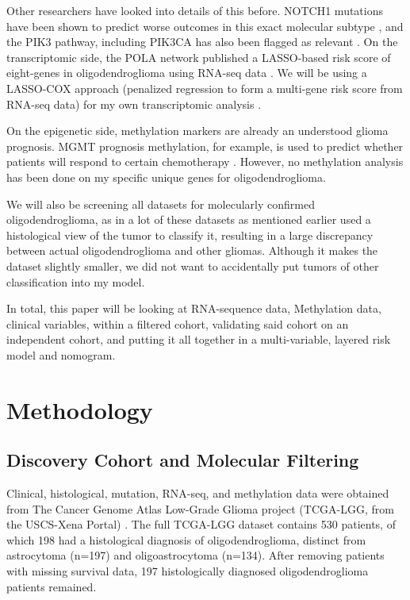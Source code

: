 \documentclass[11pt, letterpaper]{article}
\begin{document}
Other researchers have looked into details of this before. NOTCH1 mutations have been shown to predict worse outcomes in this exact molecular subtype \cite{Aoki2018}, and the PIK3 pathway, including PIK3CA has also been flagged as relevant \cite{CancerGenomeAtlas2015}. On the transcriptomic side, the POLA network published a LASSO-based risk score of eight-genes in oligodendroglioma using RNA-seq data \cite{Bertucci2023}. We will be using a LASSO-COX approach \cite{Friedman2010} (penalized regression to form a multi-gene risk score from RNA-seq data) \cite{Bertucci2023} for my own transcriptomic analysis \cite{Cox1972}.

On the epigenetic side, methylation markers are already an understood glioma prognosis. MGMT prognosis methylation, for example, is used to predict whether patients will respond to certain chemotherapy \cite{Hegi2005}. However, no methylation analysis has been done on my specific unique genes for oligodendroglioma. 

We will also be screening all datasets for molecularly confirmed oligodendroglioma, as in a lot of these datasets as mentioned earlier used a histological view of the tumor to classify it, resulting in a large discrepancy between actual oligodendroglioma and other gliomas. Although it makes the dataset slightly smaller, we did not want to accidentally put tumors of other classification into my model.

In total, this paper will be looking at RNA-sequence data, Methylation data, clinical variables, within a filtered cohort, validating said cohort on an independent cohort, and putting it all together in a multi-variable, layered risk model and nomogram.

\section{Methodology}

\subsection{Discovery Cohort and Molecular Filtering}

Clinical, histological, mutation, RNA-seq, and methylation data were obtained from The Cancer Genome Atlas Low-Grade Glioma project (TCGA-LGG, from the USCS-Xena Portal) \cite{Goldman2020}. The full TCGA-LGG dataset contains 530 patients, of which 198 had a histological diagnosis of oligodendroglioma, distinct from astrocytoma (n=197) and oligoastrocytoma (n=134). After removing patients with missing survival data, 197 histologically diagnosed oligodendroglioma patients remained.
\end{document}
